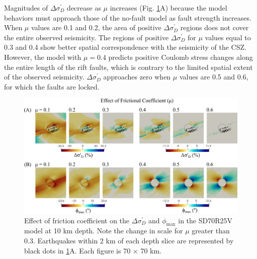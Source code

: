 \documentclass[draft]{agujournal2018}
\begin{document}
Magnitudes of $\Delta \sigma_{D}^{\prime}$ decrease as $\mu$ increases (Fig. \ref{fig:eff_of_mu}A) because the model behaviors must approach those of the no-fault model as fault strength increases. When $\mu$ values are 0.1 and 0.2, the area of positive $\Delta\sigma_{D}^{\prime}$ regions does not cover the entire observed seismicity. The regions of positive $\Delta\sigma_{D}^{\prime}$ for $\mu$ values equal to 0.3 and 0.4 show better spatial correspondence with the seismicity of the CSZ. However, the model with $\mu = 0.4$ predicts positive Coulomb stress changes along the entire length of the rift faults, which is contrary to the limited spatial extent of the observed seismicity.  $\Delta\sigma_{D}^{\prime}$ approaches zero when $\mu$ values are 0.5 and 0.6, for which the faults are locked. 

\begin{figure}[ht]
\centering
\includegraphics[width=30pc]{Figures/SD70R25V_2.png}
\caption{Effect of friction coefficient on the $\Delta\sigma_{D}^{\prime}$ and $\phi_{\max}$ in the SD70R25V model at 10 km depth. Note the change in scale for $\mu$ greater than 0.3. Earthquakes within 2 km of each depth slice are represented by black dots in \ref{fig:eff_of_mu}A.  Each figure is 70 $\times$ 70 km.} 
\label{fig:eff_of_mu}
\end{figure}
\end{document}
